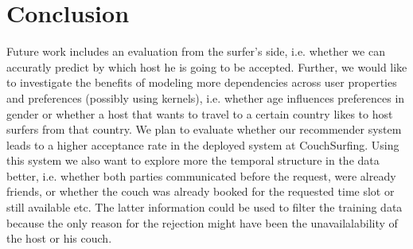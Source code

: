 \section{Conclusion}



Future work includes an evaluation from the surfer's side, i.e. whether we can accuratly predict by which host he is going to be accepted. Further, we would like to investigate the benefits of modeling more dependencies across user properties and preferences (possibly using kernels), i.e. whether age influences preferences in gender or whether a host that wants to travel to a certain country likes to host surfers from that country. We plan to evaluate whether our recommender system leads to a higher acceptance rate in the deployed system at CouchSurfing. Using this system we also want to explore more the temporal structure in the data better, i.e. whether both parties communicated before the request, were already friends, or whether the couch was already booked for the requested time slot or still available etc. The latter information could be used to filter the training data because the only reason for the rejection might have been the unavailalability of the host or his couch.
